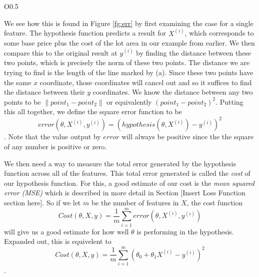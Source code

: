\documentclass{book}[a5paper]
\begin{document}
\begin{wrapfigure}{O}{0.5\textwidth}
    \centering
    \caption{Visual representation of the distance between expected and actual
    results.}
    \label{fg:err}
\end{wrapfigure}

We see how this is found in Figure \ref{fg:err} by first examining the case for
a single feature. The hypothesis function predicts a result for $X^{(i)}$, which
corresponds to some base price plus the cost of the lot area in our example from
earlier. We then compare this to the original result at $y^{(i)}$ by finding the
distance between these two points, which is precisely the norm of these two
points. The distance we are trying to find is the length of the line marked by
(a). Since these two points have the same $x$ coordinate, those coordinates will
cancel out and so it suffices to find the distance between their $y$
coordinates. We know the distance between any two points to be $\| point_1 -
point_2 \|$ or equivalently $(point_1 - point_2)^2$.  Putting this all together,
we define the square error function to be
\begin{equation}
    error(\theta, X^{(i)}, y^{(i)}) = (hypothesis(\theta, X^{(i)}) - y^{(i)})^2
\end{equation}
. Note that the value output by $error$ will always be positive since the the
square of any number is positive or zero.

We then need a way to measure the total error generated by the hypothesis
function across all of the features. This total error generated is called the
\emph{cost} of our hypothesis function. For this, a good estimate of our cost is
the \emph{mean squared error (MSE)} which is described in more detail in Section
[Insert Loss Function section here]. So if we let $m$ be the number of features
in $X$, the cost function
\begin{equation}
    Cost(\theta, X, y) = \frac{1}{m}\sum_{i=1}^m error(\theta, X^{(i)}, y^{(i)})
\end{equation}
will give us a good estimate for how well $\theta$ is performing in
the hypothesis. Expanded out, this is equivelent to
\begin{equation}
    Cost(\theta, X, y) = \frac{1}{m}\sum_{i=1}^m (\theta_0 + \theta_1X^{(i)} -
    y^{(i)})^2
\end{equation}
.
\end{document}
